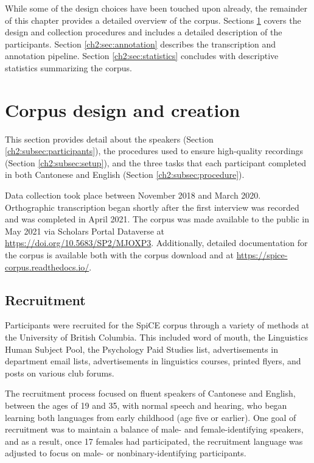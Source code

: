 While some of the design choices have been touched upon already, the remainder of this chapter provides a detailed overview of the corpus. Sections \ref{ch2:sec:design} covers the design and collection procedures and includes a detailed description of the participants. Section \ref{ch2:sec:annotation} describes the transcription and annotation pipeline. Section \ref{ch2:sec:statistics} concludes with descriptive statistics summarizing the corpus. 

\section{Corpus design and creation}\label{ch2:sec:design}

This section provides detail about the speakers (Section \ref{ch2:subsec:participants}), the procedures used to ensure high-quality recordings (Section \ref{ch2:subsec:setup}), and the three tasks that each participant completed in both Cantonese and English (Section \ref{ch2:subsec:procedure}). 

Data collection took place between November 2018 and March 2020. Orthographic transcription began shortly after the first interview was recorded and was completed in April 2021. The corpus was made available to the public in May 2021 via Scholars Portal Dataverse at \url{https://doi.org/10.5683/SP2/MJOXP3}. Additionally, detailed documentation for the corpus is available both with the corpus download and at \url{https://spice-corpus.readthedocs.io/}.

\subsection{Recruitment}

Participants were recruited for the SpiCE corpus through a variety of methods at the University of British Columbia. This included word of mouth, the Linguistics Human Subject Pool, the Psychology Paid Studies list, advertisements in department email lists, advertisements in linguistics courses, printed flyers, and posts on various club forums. 

The recruitment process focused on fluent speakers of Cantonese and English, between the ages of 19 and 35, with normal speech and hearing, who began learning both languages from early childhood (age five or earlier). One goal of recruitment was to maintain a balance of male- and female-identifying speakers, and as a result, once 17 females had participated, the recruitment language was adjusted to focus on male- or nonbinary-identifying participants.

